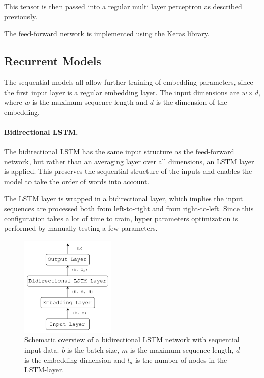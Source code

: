This tensor is then passed into a regular multi layer perceptron as described previously.

The feed-forward network is implemented using the Keras library. 

\subsection{Recurrent Models}

The sequential models all allow further training of embedding parameters, since the first input layer is a regular embedding layer. The input dimensions are $w \times d$, where $w$ is the maximum sequence length and $d$ is the dimension of the embedding. 

\paragraph{Bidirectional LSTM.}
The bidirectional LSTM has the same input structure as the feed-forward network, but rather than an averaging layer over all dimensions, an LSTM layer is applied. This preserves the sequential structure of the inputs and enables the model to take the order of words into account. 

The LSTM layer is wrapped in a bidirectional layer, which implies the input sequences are processed both from left-to-right and from right-to-left. Since this configuration takes a lot of time to train, hyper parameters optimization is performed by manually testing a few parameters.  

\begin{figure}[t]
    \centering
    \includegraphics[width=0.4\textwidth]{Figures/figs-bidir-lstm.pdf}
    \caption{Schematic overview of a bidirectional LSTM network with sequential input data. $b$ is the batch size, $m$ is the maximum sequence length, $d$ is the embedding dimension and $l_n$ is the number of nodes in the LSTM-layer.}
\end{figure}


